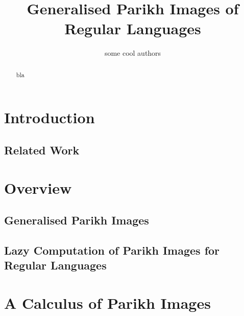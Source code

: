 \documentclass[runningheads]{llncs}
\title{Generalised Parikh Images of Regular Languages}
\author{some cool authors}
\institute{Uppsala University, Sweden}
\newif\ifoutline
\newcommand{\contents}[1]{\ifoutline{\color{blue}
    \begin{itemize}
    #1
    \end{itemize}
  }\fi}
\begin{document}
\maketitle

\begin{abstract}
  bla
\end{abstract}

\section{Introduction}

\contents{
\item key challenges: (1) complicated QE problem that was part of
  previous definitions; (2) languages with large alphabets described
  by symbolic automata; (3) regular languages described by products
  of automata
}

\subsection{Related Work}

\section{Overview}

\subsection{Generalised Parikh Images}

\contents{
\item Preliminaries, standard definition of the Parikh image of a
  regular/context-free language
\item Generalised version, considering arbitrary homomorphisms
\item Examples
}

\subsection{Lazy Computation of Parikh Images for Regular Languages}

\contents{
\item Lazy expansion of the Parikh conditions for a symbolic automaton
\item Finding elements vs.\ computing the complete Parikh image
\item Lazy product computation
}

\section{A Calculus of Parikh Images}
\end{document}

